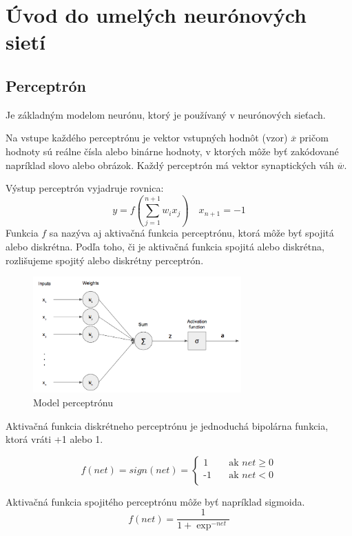 \section{Úvod do umelých neurónových sietí}

\subsection{Perceptrón}
Je základným modelom neurónu, ktorý je používaný v neurónových sieťach.

Na vstupe každého perceptrónu je vektor vstupných hodnôt (vzor) $\overline{x}$ pričom hodnoty sú reálne čísla alebo binárne hodnoty, v ktorých môže byť zakódované
napríklad slovo alebo obrázok. Každý perceptrón má vektor synaptických váh $\overline{w}$. 

Výstup perceptrón vyjadruje rovnica:
\begin{equation}
	y = f (\sum_{j=1}^{n+1} w_{i} x_{j}) \quad x_{n+1} = -1
\end{equation}
Funkcia $f$ sa nazýva aj aktivačná funkcia perceptrónu, ktorá môže byť spojitá alebo diskrétna. 
Podľa toho, či je aktivačná funkcia spojitá alebo diskrétna, rozlišujeme spojitý alebo diskrétny
perceptrón.

\begin{figure}[H]
	\centering
	\includegraphics[width=8cm]{assets/perceptron}
	\caption{Model perceptrónu}
\end{figure}

Aktivačná funkcia diskrétneho perceptrónu je jednoduchá bipolárna funkcia, ktorá vráti +1 alebo 1.


\[
f(net) = sign(net) =
     \begin{cases}
       \text{1} &\quad\text{ak } net \geq 0 \\
       \text{-1} &\quad\text{ak } net < 0 \\
     \end{cases}
\]


Aktivačná funkcia spojitého perceptrónu môže byť napríklad sigmoida.
\begin{equation}
f(net) = \frac{1}{1 + \exp^{-net}}  
\end{equation}

